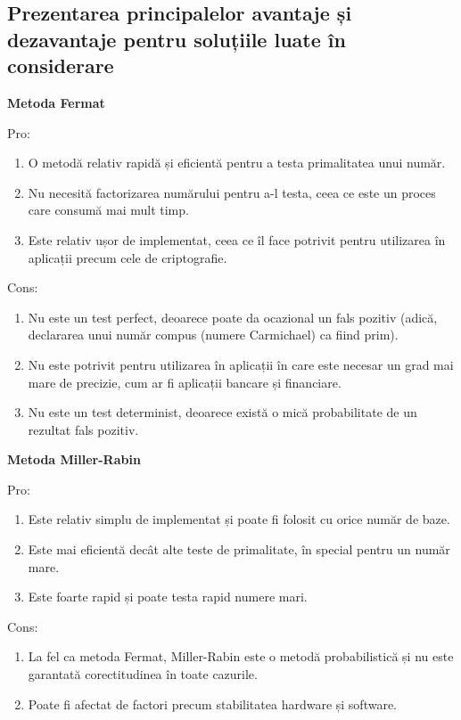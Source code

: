 \documentclass[runningheads]{llncs}
\begin{document}
\subsection{Prezentarea principalelor avantaje și dezavantaje pentru soluțiile luate în considerare}

\textbf{Metoda Fermat}

Pro:
\begin{enumerate}
    \item O metodă relativ rapidă și eficientă pentru a testa primalitatea unui număr.
    \item Nu necesită factorizarea numărului pentru a-l testa, ceea ce este un proces care consumă mai mult timp.
    \item Este relativ ușor de implementat, ceea ce îl face potrivit pentru utilizarea în aplicații precum cele de criptografie.
\end{enumerate}

Cons:
\begin{enumerate}
    \item Nu este un test perfect, deoarece poate da ocazional un fals pozitiv (adică, declararea unui număr compus (numere Carmichael) ca fiind prim).
    \item Nu este potrivit pentru utilizarea în aplicații în care este necesar un grad mai mare de precizie, cum ar fi aplicații bancare și financiare.
    \item Nu este un test determinist, deoarece există o mică probabilitate de un rezultat fals pozitiv.
\end{enumerate}

\textbf{Metoda Miller-Rabin}

Pro:
\begin{enumerate}
    \item Este relativ simplu de implementat și poate fi folosit cu orice număr de baze.
    \item Este mai eficientă decât alte teste de primalitate, în special pentru un număr mare.
    \item Este foarte rapid și poate testa rapid numere mari.
\end{enumerate}

Cons:
\begin{enumerate}
    \item La fel ca metoda Fermat, Miller-Rabin este o metodă probabilistică și nu este garantată corectitudinea în toate cazurile.
    \item Poate fi afectat de factori precum stabilitatea hardware și software.
\end{enumerate}
\end{document}
